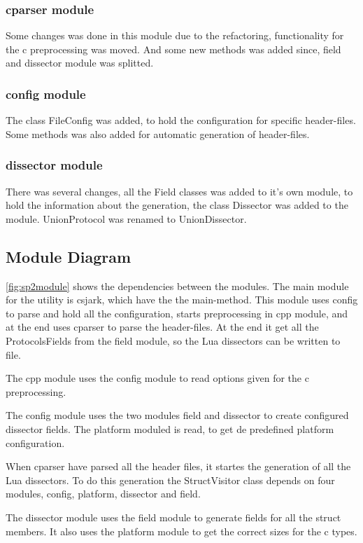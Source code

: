 \subsubsection{cparser module}
Some changes was done in this module due to the refactoring, functionality for the c preprocessing was moved. And some new methods was added since, field and dissector module was splitted. 

\subsubsection{config module}
The class FileConfig was added, to hold the configuration for specific header-files. Some methods was also added for automatic generation of header-files.

\subsubsection{dissector module}
There was several changes, all the Field classes was added to it's own module, to hold the information about the generation, the class Dissector was added to the module. UnionProtocol was renamed to UnionDissector.

\subsection{Module Diagram}
\autoref{fig:sp2module} shows the dependencies between the modules. The main 
module for the utility is csjark, which have the the main-method. This module 
uses config to parse and hold all the configuration, starts preprocessing in 
cpp module, and at the end uses cparser to parse the header-files. At the end 
it get all the ProtocolsFields from the field module, so the Lua dissectors 
can be written to file.

The cpp module uses the config module to read options given for the c 
preprocessing.

The config module uses the two modules field and dissector to create 
configured dissector fields. The platform moduled is read, to get de 
predefined platform configuration.

When cparser have parsed all the header files, it startes the generation of 
all the Lua dissectors. To do this generation the StructVisitor class depends 
on four modules, config, platform, dissector and field.

The dissector module uses the field module to generate fields for all the 
struct members. It also uses the platform module to get the correct sizes for 
the c types.

